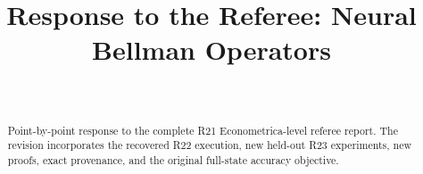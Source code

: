 \documentclass[ecta]{econsocart}
\theoremstyle{remark}
\begin{document}
\begin{frontmatter}
\title{Response to the Referee: Neural Bellman Operators}
\begin{aug}
\author[id=au1,addressref={add1}]{~}
\address[id=add1]{}
\end{aug}
\begin{abstract}Point-by-point response to the complete R21 Econometrica-level referee report. The revision incorporates the recovered R22 execution, new held-out R23 experiments, new proofs, exact provenance, and the original full-state accuracy objective.\end{abstract}
\end{frontmatter}

\end{document}
